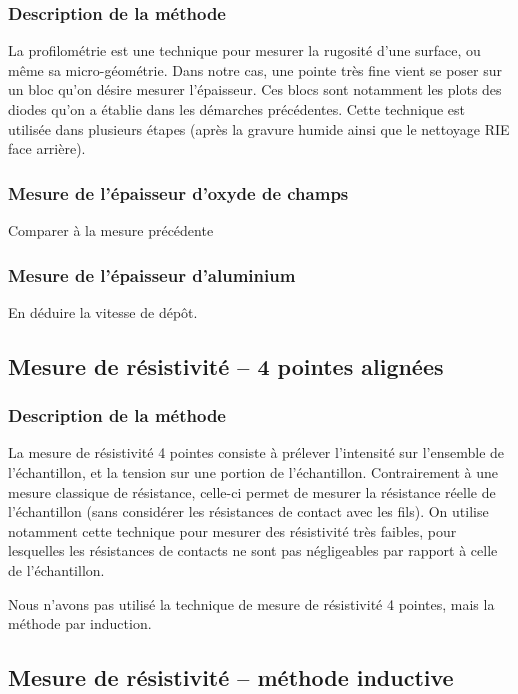 \documentclass[11pt]{article}
\begin{document}
\subsubsection{Description de la m\'ethode}

La profilom\'etrie est une technique pour mesurer la rugosit\'e d'une surface, ou même sa micro-g\'eom\'etrie. Dans notre cas, une pointe tr\`es fine vient se poser sur un bloc qu'on d\'esire mesurer l'\'epaisseur. Ces blocs sont notamment les plots des diodes qu'on a \'etablie dans les d\'emarches pr\'ec\'edentes. Cette technique est utilis\'ee dans plusieurs \'etapes (apr\`es la gravure humide ainsi que le nettoyage RIE face arri\`ere). 

\subsubsection{Mesure de l'\'epaisseur d'oxyde de champs} 
Comparer \`a la mesure pr\'ec\'edente
\subsubsection{Mesure de l'\'epaisseur d'aluminium} 

En d\'eduire la vitesse de d\'ep\^ot.

\subsection{Mesure de r\'esistivit\'e -- 4 pointes align\'ees}

\subsubsection{Description de la m\'ethode}
La mesure de r\'esistivit\'e 4 pointes consiste \`a pr\'elever l'intensit\'e sur l'ensemble de l'\'echantillon, et la tension sur une portion de l'\'echantillon. Contrairement \`a une mesure classique de r\'esistance, celle-ci permet de mesurer la r\'esistance r\'eelle de l'\'echantillon (sans consid\'erer les r\'esistances de contact avec les fils). On utilise notamment cette technique pour mesurer des r\'esistivit\'e tr\`es faibles, pour lesquelles les r\'esistances de contacts ne sont pas n\'egligeables par rapport \`a celle de l'\'echantillon.  

Nous n'avons pas utilis\'e la technique de mesure de r\'esistivit\'e 4 pointes, mais la m\'ethode par induction. 
    
\subsection{Mesure de r\'esistivit\'e -- m\'ethode inductive}
\end{document}
